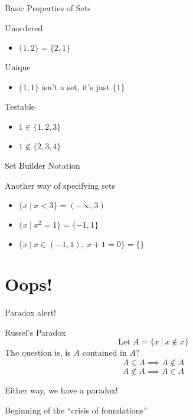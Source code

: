 \documentclass[xcolor=svgnames]{beamer}
\begin{document}
\begin{frame}{Basic Properties of Sets}

    Unordered
        \begin{itemize}
        \item $\{1,2\} = \{2,1\}$
        \end{itemize} \pause
    Unique
        \begin{itemize}
        \item $\{1,1\}$ isn't a set, it's just $\{1\}$
        \end{itemize} \pause
    Testable
        \begin{itemize}
        \item $1 \in \{1,2,3\}$
        \item $1 \notin \{2,3,4\}$
        \end{itemize} \pause


\end{frame}

\begin{frame}{Set Builder Notation}
    
    Another way of specifying sets
    \begin{itemize}
    \item $\{x\ |\ x < 3\} = (-\infty,3)$ 
    \item $\{x\ |\ x^2 = 1\} = \{-1,1\}$
    \item $\{x\ |\ x \in (-1,1),\ x + 1 = 0\} = \{\}$
    \end{itemize}

\end{frame}

\section{Oops!}

\begin{frame}{}
    \begin{center}
    \Huge Paradox alert!
    \end{center}
\end{frame}

\begin{frame}{Russel's Paradox}
    $$\text{Let } A = \{x\ |\ x \notin x\}$$
    The question is, is $A$ contained in $A$?
    $$A \in A \implies A \notin A$$ \pause
    $$A \notin A \implies A \in A$$ \pause

    Either way, we have a paradox!
    \pause
    
    Beginning of the ``crisis of foundations''
\end{frame}
\end{document}
